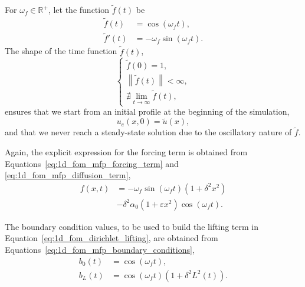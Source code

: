 \documentclass[../../main.tex]{subfiles}
\begin{document}
For $\omega_f \in \mathbb{R}^{+}$, let the function $\tilde{f}(t)$ be
\begin{subequations}
    \begin{align}
        \tilde{f}(t) &= \cos{(\omega_f t)}, \\ 
        \tilde{f}'(t) &= -\omega_f \sin{(\omega_f t)}.
    \end{align}    
\end{subequations}
The shape of the time function $\tilde{f}(t)$,
\begin{equation*}
    \begin{cases}
    \tilde{f}(0) = 1, \\ 
    \left\|\tilde{f}(t)\right\| < \infty, \\ 
    \nexists \lim_{t \rightarrow \infty} \tilde{f}(t),
    \end{cases}
\end{equation*}
ensures that we start from an initial profile at the beginning of the simulation,
\begin{equation}
    u_e(x,0) = \tilde{u}(x),
\end{equation}
and that we never reach a steady-state solution due to the oscillatory nature of $\tilde{f}$.

Again, the explicit expression for the forcing term is obtained from Equations~\eqref{eq:1d_fom_mfp_forcing_term} and \eqref{eq:1d_fom_mfp_diffusion_term},
\begin{equation}
    \begin{split}
        f(x,t) &= -\omega_f \sin{(\omega_f t)}(1+\delta^2 x^2) \\ 
        &- \delta^2 \alpha_0(1 + \varepsilon x^2) \cos{(\omega_f t)}.
    \end{split}
\end{equation}

The boundary condition values, to be used to build the lifting term in Equation~\eqref{eq:1d_fom_dirichlet_lifting}, are obtained from Equations~\eqref{eq:1d_fom_mfp_boundary_conditions},
\begin{subequations}
    \begin{align}
        b_0(t) &= \cos{(\omega_f t)}, \\
        b_L(t) &= \cos{(\omega_f t)}\left(1 + \delta^2 L^{2}(t)\right).
    \end{align}
\end{subequations}
\end{document}
